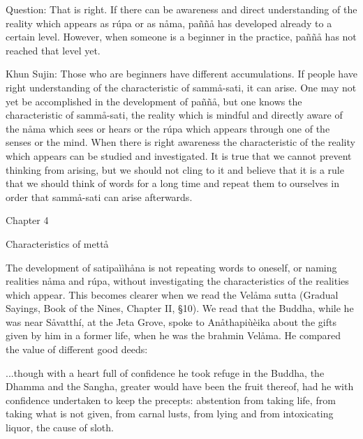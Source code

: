 \documentclass[12pt,twoside]{article}
\begin{document}
Question: That is right. If there can be awareness and direct
understanding of the reality which appears as r\'upa or as n{\aa}ma,
pa\~n\~n{\aa} has developed already to a certain level. However, when
someone is a beginner in the practice, pa\~n\~n{\aa} has not reached
that level yet. 

Khun Sujin: Those who are beginners have different accumulations. If
people have right understanding of the characteristic of
samm{\aa}{}-sati, it can arise. One may not yet be accomplished in the
development of pa\~n\~n{\aa}, but one knows the characteristic of
samm{\aa}{}-sati, the reality which is mindful and directly aware of
the n{\aa}ma which sees or hears or the r\'upa which appears through
one of the senses or the mind. When there is right awareness the
characteristic of the reality which appears can be studied and
investigated. It is true that we cannot prevent thinking from arising,
but we should not cling to it and believe that it is a rule that we
should think of words for a long time and repeat them to ourselves in
order that samm{\aa}{}-sati can arise afterwards. 


\bigskip


\bigskip

\clearpage
Chapter 4


\bigskip


\bigskip

Characteristics of mett{\aa}


\bigskip


\bigskip

The development of satipa\`i\`ih{\aa}na is not repeating words to
oneself, or naming realities
{\textasciigrave}{\textasciigrave}n{\aa}ma{\textquotesingle}{\textquotesingle}
and r\'upa{\textquotesingle}{\textquotesingle}, without investigating
the characteristics of the realities which appear. This becomes clearer
when we read the {\textasciigrave}{\textasciigrave}Vel{\aa}ma
sutta{\textquotesingle}{\textquotesingle} (Gradual Sayings, Book of the
Nines, Chapter II, {\S}10). We read that the Buddha, while he was near
S{\aa}vatth\'i, at the Jeta Grove, spoke to An{\aa}thapi\`u\`eika about
the gifts given by him in a former life, when he was the brahmin
Vel{\aa}ma. He compared the value of different good deeds:


\bigskip

...though with a heart full of confidence he took refuge in the Buddha,
the Dhamma and the Sangha, greater would have been the fruit thereof,
had he with confidence undertaken to keep the precepts: abstention from
taking life, from taking what is not given, from carnal lusts, from
lying and from intoxicating liquor, the cause of sloth. 
\end{document}
